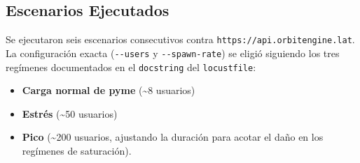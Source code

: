 \subsection{Escenarios Ejecutados}\label{escenarios-ejecutados}

Se ejecutaron seis escenarios consecutivos contra \texttt{https://api.orbitengine.lat}. La configuración exacta (\texttt{-\/-users} y \texttt{-\/-spawn-rate}) se eligió siguiendo los tres regímenes documentados en el \texttt{docstring} del \texttt{locustfile}:

\begin{itemize}
\tightlist
\item
  \textbf{Carga normal de pyme} (\textasciitilde8 usuarios)
\item
  \textbf{Estrés} (\textasciitilde50 usuarios)
\item
  \textbf{Pico} (\textasciitilde200 usuarios, ajustando la duración para acotar el daño en los regímenes de saturación).
\end{itemize}


